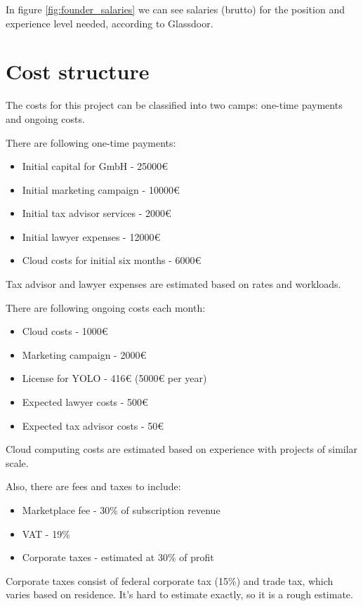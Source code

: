 In figure \ref{fig:founder_salaries} we can see salaries (brutto) for the position and experience level needed, according to Glassdoor.

\section{Cost structure}

The costs for this project can be classified into two camps: one-time payments and ongoing costs.

There are following one-time payments:

\begin{itemize}
    \item Initial capital for GmbH - 25000€
    \item Initial marketing campaign - 10000€
    \item Initial tax advisor services - 2000€
    \item Initial lawyer expenses - 12000€
    \item Cloud costs for initial six months - 6000€
\end{itemize}

Tax advisor and lawyer expenses are estimated based on rates and workloads.

There are following ongoing costs each month:

\begin{itemize}
    \item Cloud costs - 1000€
    \item Marketing campaign - 2000€
    \item License for YOLO - 416€ (5000€ per year)
    \item Expected lawyer costs - 500€
    \item Expected tax advisor costs - 50€
\end{itemize}

Cloud computing costs are estimated based on experience with projects of similar scale.

Also, there are fees and taxes to include:

\begin{itemize}
    \item Marketplace fee - 30\% of subscription revenue
    \item VAT - 19\%
    \item Corporate taxes - estimated at 30\% of profit
\end{itemize}

Corporate taxes consist of federal corporate tax (15\%) and trade tax, which varies based on residence. It's hard to estimate exactly, so it is a rough estimate.

